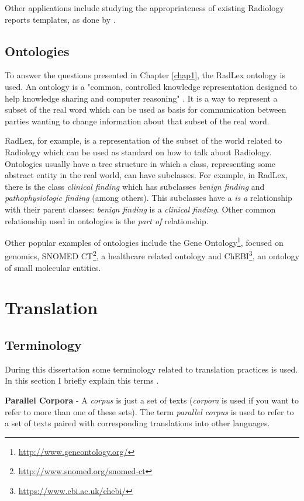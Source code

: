 Other applications include studying the appropriateness of existing Radiology reports templates, as done by \citep{Hong2013}.

\subsection{Ontologies}

To answer the questions presented in Chapter \ref{chap1}, the RadLex ontology is used. An ontology is a "common, controlled knowledge representation designed to help knowledge sharing and computer reasoning" \citep{Robinson2011}. It is a way to represent a subset of the real word  which can be used as basis for communication between parties wanting to change information about that subset of the real word.

RadLex, for example, is a representation of the subset of the world related to Radiology which can be used as standard on how to talk about Radiology. Ontologies usually have a tree structure in which a class, representing some abstract entity in the real world, can have subclasses. For example, in RadLex, there is the class \textit{clinical finding} which has subclasses \textit{benign finding} and \textit{pathophysiologic finding} (among others). This subclasses have a \textit{is a} relationship with their parent classes: \textit{benign finding} is a \textit{clinical finding}. Other common relationship used in ontologies is the \textit{part of} relationship.

Other popular examples of ontologies include the Gene Ontology\footnote{\url{http://www.geneontology.org/}}, focused on genomics, SNOMED CT\footnote{\url{http://www.snomed.org/snomed-ct}}, a healthcare related ontology and ChEBI\footnote{\url{https://www.ebi.ac.uk/chebi/}}, an ontology of small molecular entities.

\section{Translation}

\subsection{Terminology}

During this dissertation some terminology related to translation practices is used. In this section I briefly explain this terms \citep{Koehn2010}. 

\textbf{Parallel Corpora} - A \textit{corpus} is just a set of texts (\textit{corpora} is used if you want to refer to more than one of these sets). The term \textit{parallel corpus} is used to refer to a set of texts paired with corresponding translations into other languages. 

